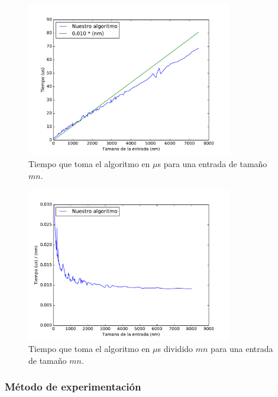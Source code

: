 

\begin{figure}[H]
 \centering
	\includegraphics[width=0.8\textwidth]{img/exp/problema3-promedio.pdf}
	\caption{\footnotesize Tiempo que toma el algoritmo en $\mu$s para una entrada de tamaño $mn$.}
	\label{fig:problema3-promedio}
\end{figure}

\begin{figure}[H]
 \centering
	\includegraphics[width=0.8\textwidth]{img/exp/problema3-promedio2.pdf}
	\caption{\footnotesize Tiempo que toma el algoritmo en $\mu$s dividido $mn$ para una entrada de tamaño $mn$.}
	\label{fig:problema3-promedio2}
\end{figure}


\subsubsection{M\'etodo de experimentación}
